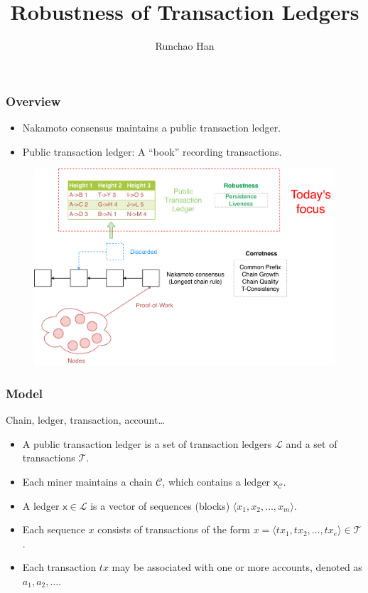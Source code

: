 \documentclass{beamer}
\title{Robustness of Transaction Ledgers}
\author{Runchao Han}
\institute{}
\date{}
\begin{document}
\frame{\titlepage}


\begin{frame}
\frametitle{Overview}

\begin{itemize}
    \item Nakamoto consensus maintains a public transaction ledger.
    \item Public transaction ledger: A ``book'' recording transactions.
\end{itemize}

\begin{figure}
    \centering
    \includegraphics[width=.8\textwidth]{overview.pdf}
\end{figure}

\end{frame}


\begin{frame}
\frametitle{Model}

Chain, ledger, transaction, account\dots

\begin{itemize}
    \item A public transaction ledger is a set of transaction ledgers $\mathcal{L}$ and a set of transactions $\mathcal{T}$.
    \item Each miner maintains a chain $\mathcal{C}$, which contains a ledger $\mathsf{x}_{\mathcal{C}}$.
    \item A ledger $\mathsf{x} \in \mathcal{L}$ is a vector of sequences (blocks) $\langle x_1, x_2, \dots, x_m \rangle$.
    \item Each sequence $x$ consists of transactions of the form $x = \langle tx_1, tx_2, \dots, tx_e \rangle \in \mathcal{T}$.
    \item Each transaction $tx$ may be associated with one or more accounts, denoted as $a_1, a_2, \dots$.
\end{itemize}

\end{frame}
\end{document}

